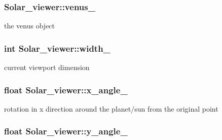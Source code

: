 \subsubsection[{\texorpdfstring{venus\+\_\+}{venus_}}]{ Solar\+\_\+viewer\+::venus\+\_\+\hspace{0.3cm}{\ttfamily [private]}}\hypertarget{classSolar__viewer_a52df2043cba78b9afef933ce6515303d}{}\label{classSolar__viewer_a52df2043cba78b9afef933ce6515303d}


the venus object 

\subsubsection[{\texorpdfstring{width\+\_\+}{width_}}]{\setlength{\rightskip}{0pt plus 5cm}int Solar\+\_\+viewer\+::width\+\_\+\hspace{0.3cm}{\ttfamily [private]}}\hypertarget{classSolar__viewer_ad12592d718e123912365df3ef23a2dbb}{}\label{classSolar__viewer_ad12592d718e123912365df3ef23a2dbb}


current viewport dimension 

\subsubsection[{\texorpdfstring{x\+\_\+angle\+\_\+}{x_angle_}}]{\setlength{\rightskip}{0pt plus 5cm}float Solar\+\_\+viewer\+::x\+\_\+angle\+\_\+\hspace{0.3cm}{\ttfamily [private]}}\hypertarget{classSolar__viewer_afe0f50221ea1464e4b1a9c79071bcac0}{}\label{classSolar__viewer_afe0f50221ea1464e4b1a9c79071bcac0}


rotation in x direction around the planet/sun from the original point 

\subsubsection[{\texorpdfstring{y\+\_\+angle\+\_\+}{y_angle_}}]{\setlength{\rightskip}{0pt plus 5cm}float Solar\+\_\+viewer\+::y\+\_\+angle\+\_\+\hspace{0.3cm}{\ttfamily [private]}}\hypertarget{classSolar__viewer_aec80e0da0a52b108b1b7223d2a974860}{}\label{classSolar__viewer_aec80e0da0a52b108b1b7223d2a974860}


